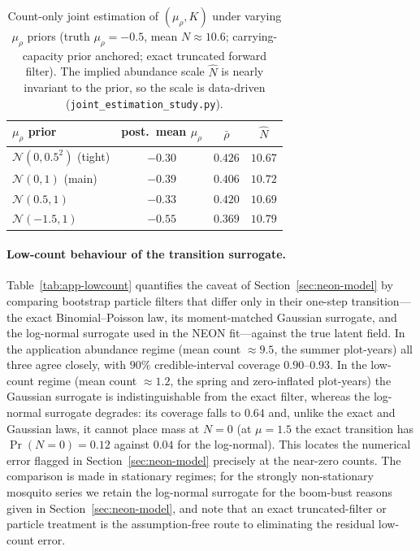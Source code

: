 \documentclass[preprint,12pt]{elsarticle}
\theoremstyle{definition}
\begin{document}
\begin{table}[t]
\centering\small\renewcommand{\arraystretch}{1.2}
\begin{tabular}{lccc}
\toprule
$\mu_\rho$ prior & post.\ mean $\mu_\rho$ & $\bar\rho$ & $\hat N$ \\
\midrule
$\mathcal N(0,0.5^2)$ (tight) & $-0.30$ & $0.426$ & $10.67$ \\
$\mathcal N(0,1)$ (main)      & $-0.39$ & $0.406$ & $10.72$ \\
$\mathcal N(0.5,1)$           & $-0.33$ & $0.420$ & $10.69$ \\
$\mathcal N(-1.5,1)$          & $-0.55$ & $0.369$ & $10.79$ \\
\bottomrule
\end{tabular}
\caption{Count-only joint estimation of $(\mu_\rho,K)$ under varying $\mu_\rho$
priors (truth $\mu_\rho=-0.5$, mean $N\approx10.6$; carrying-capacity prior
anchored; exact truncated forward filter). The implied abundance scale $\hat N$
is nearly invariant to the prior, so the scale is data-driven
(\texttt{joint\_estimation\_study.py}).}
\label{tab:app-scale}
\end{table}

\paragraph{Low-count behaviour of the transition surrogate.}
Table~\ref{tab:app-lowcount} quantifies the caveat of Section~\ref{sec:neon-model}
by comparing bootstrap particle filters that differ only in their one-step
transition---the exact Binomial--Poisson law, its moment-matched Gaussian
surrogate, and the log-normal surrogate used in the NEON fit---against the true
latent field. In the application abundance regime (mean count $\approx\!9.5$,
the summer plot-years) all three agree closely, with $90\%$ credible-interval
coverage $0.90$--$0.93$. In the low-count regime (mean count $\approx\!1.2$, the
spring and zero-inflated plot-years) the Gaussian surrogate is indistinguishable
from the exact filter, whereas the log-normal surrogate degrades: its coverage
falls to $0.64$ and, unlike the exact and Gaussian laws, it cannot place mass at
$N=0$ (at $\mu=1.5$ the exact transition has $\Pr(N=0)=0.12$ against $0.04$ for
the log-normal). This locates the numerical error flagged in
Section~\ref{sec:neon-model} precisely at the near-zero counts. The comparison is
made in stationary regimes; for the strongly non-stationary mosquito series we
retain the log-normal surrogate for the boom-bust reasons given in
Section~\ref{sec:neon-model}, and note that an exact truncated-filter or particle
treatment is the assumption-free route to eliminating the residual low-count
error.
\end{document}
